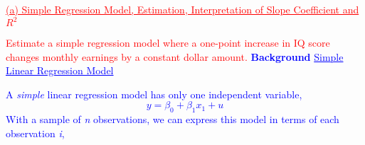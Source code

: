 \documentclass[12pt]{report}
\newenvironment{blueframed}[1][blue]
{\def\FrameCommand{\fboxsep=\FrameSep\fcolorbox{#1}{white}}%
\MakeFramed {\advance\hsize-\width \FrameRestore}}
{\endMakeFramed}
\begin{document}
\noindent \textcolor{red}{\underline{(a) Simple Regression Model, Estimation, Interpretation of Slope Coefficient and $R^2$}}

\noindent \textcolor{red}{Estimate a simple regression model where a one-point increase in IQ score changes monthly earnings by a constant dollar amount.}
\justify
\begin{blueframed}
	\textcolor{blue}{\textbf{Background}}	
	\vspace{-\baselineskip}
	\justify
	\textcolor{blue}{\underline{Simple Linear Regression Model}}
	
	\noindent \textcolor{blue}{A \textit{simple} linear regression model has only one independent variable, $$y = \beta_0+\beta_1x_{1}+u$$ With a sample of \textit{n} observations, we can express this model in terms of each observation \textit{i},
	}
\end{blueframed}
\end{document}
